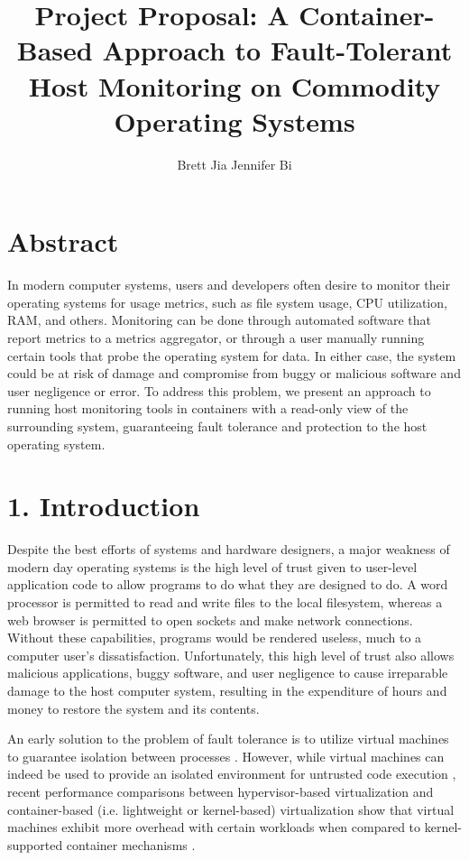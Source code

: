 \documentclass{proc}
\begin{document}
\title{Project Proposal: A Container-Based Approach to Fault-Tolerant Host Monitoring on Commodity Operating Systems}

\author{Brett Jia \hspace{1em} Jennifer Bi}

\maketitle

\section*{Abstract}

In modern computer systems, users and developers often desire to monitor their operating systems for usage metrics, such as file system usage, CPU utilization, RAM, and others. Monitoring can be done through automated software that report metrics to a metrics aggregator, or through a user manually running certain tools that probe the operating system for data. In either case, the system could be at risk of damage and compromise from buggy or malicious software and user negligence or error. To address this problem, we present an approach to running host monitoring tools in containers with a read-only view of the surrounding system, guaranteeing fault tolerance and protection to the host operating system.

\section*{1. Introduction}

Despite the best efforts of systems and hardware designers, a major weakness of modern day operating systems is the high level of trust given to user-level application code to allow programs to do what they are designed to do. A word processor is permitted to read and write files to the local filesystem, whereas a web browser is permitted to open sockets and make network connections. Without these capabilities, programs would be rendered useless, much to a computer user's dissatisfaction. Unfortunately, this high level of trust also allows malicious applications, buggy software, and user negligence to cause irreparable damage to the host computer system, resulting in the expenditure of hours and money to restore the system and its contents.

An early solution to the problem of fault tolerance is to utilize virtual machines to guarantee isolation between processes \cite{garfinkel2003terra}. However, while virtual machines can indeed be used to provide an isolated environment for untrusted code execution \cite{wen2012virtualization}, recent performance comparisons between hypervisor-based virtualization and container-based (i.e. lightweight or kernel-based) virtualization show that virtual machines exhibit more overhead with certain workloads when compared to kernel-supported container mechanisms \cite{felter2014docker, morabito2015hypervisors}.
\end{document}

